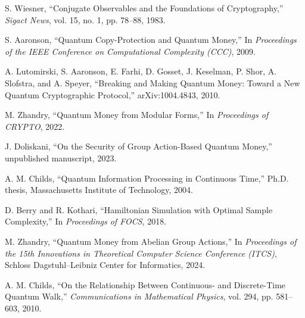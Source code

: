 \documentclass[12pt]{report}
\begin{document}

\begin{thebibliography}{99}

    S. Wiesner, ``Conjugate Observables and the Foundations of Cryptography,'' \textit{Sigact News}, vol. 15, no. 1, pp. 78–88, 1983.
    
    S. Aaronson, ``Quantum Copy-Protection and Quantum Money,'' In \textit{Proceedings of the IEEE Conference on Computational Complexity (CCC)}, 2009.
    
    A. Lutomirski, S. Aaronson, E. Farhi, D. Gosset, J. Keselman, P. Shor, A. Slofstra, and A. Speyer, ``Breaking and Making Quantum Money: Toward a New Quantum Cryptographic Protocol,'' arXiv:1004.4843, 2010.
    
    M. Zhandry, ``Quantum Money from Modular Forms,'' In \textit{Proceedings of CRYPTO}, 2022.
    
    J. Doliskani, ``On the Security of Group Action-Based Quantum Money,'' unpublished manuscript, 2023.
    
    A. M. Childs, ``Quantum Information Processing in Continuous Time,'' Ph.D. thesis, Massachusetts Institute of Technology, 2004.
    
    D. Berry and R. Kothari, ``Hamiltonian Simulation with Optimal Sample Complexity,'' In \textit{Proceedings of FOCS}, 2018.

    M. Zhandry, ``Quantum Money from Abelian Group Actions,'' In \textit{Proceedings of the 15th Innovations in Theoretical Computer Science Conference (ITCS)}, Schloss Dagstuhl–Leibniz Center for Informatics, 2024.


    A. M. Childs, ``On the Relationship Between Continuous- and Discrete-Time Quantum Walk,'' \textit{Communications in Mathematical Physics}, vol. 294, pp. 581–603, 2010.

\end{thebibliography}
\end{document}
